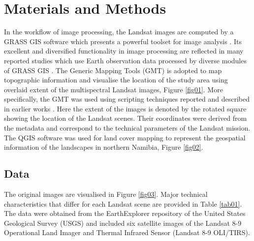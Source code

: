 \documentclass[climate,article,submit,pdftex,moreauthors]{Definitions/mdpi}
\begin{document}
\section{Materials and Methods}
 
In the workflow of image processing, the Landsat images are computed by a GRASS GIS software which presents a powerful toolset for image analysis \cite{GRASS_GIS_software}. Its excellent and diversified functionality in image processing are reflected in many reported studies which use Earth observation data processed by diverse modules of GRASS GIS \cite{HOFIERKA2009387,lemenkova2024exploitation,Lemenkova202320,ROCCHINI201382,Lemenkova202313,JASIEWICZ20111162}. The Generic Mapping Tools (GMT) \cite{Wessel} is adopted to map topographic information and visualise the location of the study area using overlaid extent of the multispectral Landsat images, Figure \ref{fig01}. More specifically, the GMT was used using scripting techniques reported and described in earlier works \cite{Lemenkova202203,Lemenkova202217}. Here the extent of the images is denoted by the rotated square showing the location of the Landsat scenes. Their coordinates were derived from the metadata and correspond to the technical parameters of the Landsat mission. The QGIS software was used for land cover mapping to represent the geospatial information of the landscapes in northern Namibia, Figure \ref{fig02}. 

\subsection{Data}
The original images are visualised in Figure \ref{fig03}. Major technical characteristics that differ for each Landsat scene are provided in Table \ref{tab01}. The data were obtained from the EarthExplorer repository of the United States Geological Survey (USGS) and included six satellite images of the Landsat 8-9 Operational Land Imager and Thermal Infrared Sensor (Landsat 8-9 OLI/TIRS). 
\end{document}
